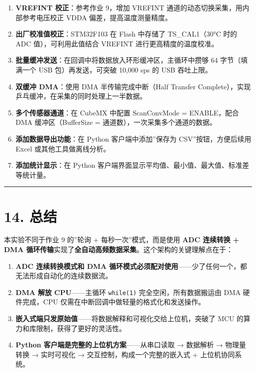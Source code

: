 \documentclass[
  chinese,
  UTF8,
  oneside,
  openany]{ctexbook}
\providecommand{\tightlist}{%
  \setlength{\itemsep}{0pt}\setlength{\parskip}{0pt}}
\begin{document}
\begin{enumerate}
\def\labelenumi{\arabic{enumi}.}
\tightlist
\item
  \textbf{VREFINT 校正}：参考作业 9，增加 VREFINT
  通道的动态切换采集，用内部参考电压校正 VDDA 偏差，提高温度测量精度。
\item
  \textbf{出厂校准值校正}：STM32F103 在 Flash 中存储了 TS\_CAL1（30°C
  时的 ADC 值），可利用此值结合 VREFINT 进行更高精度的温度校准。
\item
  \textbf{批量缓冲发送}：在回调中将数据放入环形缓冲区，主循环中攒够 64
  字节（填满一个 USB 包）再发送，可突破 10,000 sps 的 USB 吞吐上限。
\item
  \textbf{双缓冲 DMA}：使用 DMA 半传输完成中断（Half Transfer
  Complete），实现乒乓缓冲，在采集的同时处理上一半数据。
\item
  \textbf{多个传感器通道}：在 CubeMX 中配置 ScanConvMode = ENABLE，配合
  DMA 缓冲区（BufferSize = 通道数），一次采集多个通道的数据。
\item
  \textbf{添加数据导出功能}：在 Python 客户端中添加''保存为
  CSV''按钮，方便后续用 Excel 或其他工具做离线分析。
\item
  \textbf{添加统计显示}：在 Python
  客户端界面显示平均值、最小值、最大值、标准差等统计量。
\end{enumerate}

\begin{center}\rule{0.5\linewidth}{0.5pt}\end{center}

\section{14. 总结}\label{ux603bux7ed3-2}

本实验不同于作业 9 的''轮询 + 每秒一次''模式，而是使用 \textbf{ADC
连续转换 + DMA
循环传输}实现了\textbf{全自动高频数据采集}。这个架构的关键理解点在于：

\begin{enumerate}
\def\labelenumi{\arabic{enumi}.}
\tightlist
\item
  \textbf{ADC 连续转换模式和 DMA
  循环模式必须配对使用}------少了任何一个，都无法形成自动化的连续数据流。
\item
  \textbf{DMA 解放 CPU}------主循环 \texttt{while(1)}
  完全空闲，所有数据搬运由 DMA 硬件完成，CPU
  仅需在中断回调中做轻量的格式化和发送操作。
\item
  \textbf{嵌入式端只发原始值}------将数据解释和可视化交给上位机，突破了
  MCU 的算力和库限制，获得了更好的灵活性。
\item
  \textbf{Python 客户端是完整的上位机方案}------从串口读取 → 数据解析 →
  物理量转换 → 实时可视化 → 交互控制，构成一个完整的嵌入式 +
  上位机协同系统。
\end{enumerate}
\end{document}
